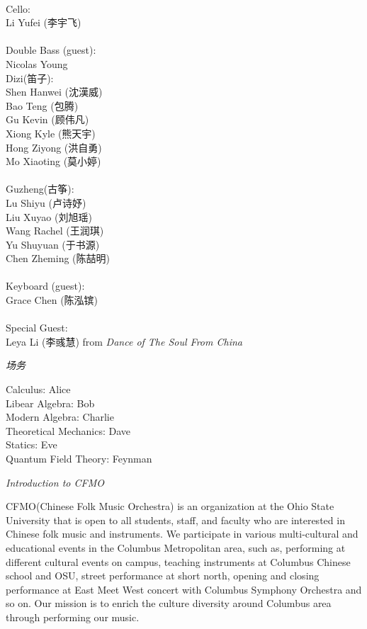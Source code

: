 \documentclass[letter,6pt,poets]{ConcProg}
\begin{document}
\begin{spacing}{1.0}
\begin{multicols}{2}
\\
Cello:\\
Li Yufei (李宇飞)\\
\\
Double Bass (guest):\\
Nicolas Young\\

Dizi(笛子): 				 \\    
Shen Hanwei		(沈漢威)     \\
Bao Teng  (包腾)\\
Gu Kevin   (顾伟凡)               \\
Xiong Kyle (熊天宇)\\
Hong Ziyong (洪自勇)\\
Mo Xiaoting (莫小婷)\\
\\
Guzheng({古筝}):\\
Lu Shiyu (卢诗妤)\\
Liu Xuyao  (刘旭瑶)\\               
Wang Rachel (王润琪) \\
Yu Shuyuan   (于书源)\\
Chen Zheming  (陈喆明)\\
\\
Keyboard (guest):\\
Grace Chen (陈泓镔)
\\
\\
Special Guest:\\
Leya Li (李彧慧)
 \small{ from \emph{ Dance of The Soul From China}}
\\
\end{multicols}
\begin{center}
\Large\textsl{ 场务}
\end{center}
\begin{multicols}{2}%
Calculus: Alice\\
Libear Algebra: Bob\\
Modern Algebra: Charlie\\
Theoretical Mechanics: Dave\\
Statics: Eve\\
Quantum Field Theory: Feynman



\end{multicols}
\begin{center}
\Large\textsl{ Introduction to CFMO}
\end{center}

CFMO(Chinese Folk Music Orchestra) is an organization at the Ohio State University that is open to all students, staff, and faculty who are interested in Chinese folk music and instruments. We participate in various multi-cultural and educational events in the Columbus Metropolitan area, such as, performing at different cultural events on campus, teaching instruments at Columbus Chinese school and OSU, street performance at short north, opening and closing performance at East Meet West concert with Columbus Symphony Orchestra and so on. Our mission is to enrich the culture diversity around Columbus area through performing our music.
\end{spacing}
\end{document}
